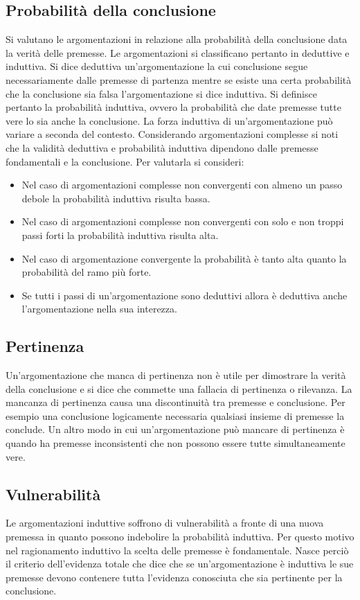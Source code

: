 \subsection{Probabilit\`a della conclusione}
Si valutano le argomentazioni in relazione alla probabilit\`a della conclusione data la verit\`a delle premesse. Le argomentazioni si classificano pertanto in deduttive e induttiva. Si dice deduttiva 
un'argomentazione la cui conclusione segue necessariamente dalle premesse di partenza mentre se esiste una certa probabilit\`a che la conclusione sia falsa l'argomentazione si dice induttiva. Si definisce 
pertanto la probabilit\`a induttiva, ovvero la probabilit\`a che date premesse tutte vere lo sia anche la conclusione. La forza induttiva di un'argomentazione pu\`o variare a seconda del contesto. 
Considerando argomentazioni complesse si noti che la validit\`a deduttiva e probabilit\`a induttiva dipendono dalle premesse fondamentali e la conclusione. Per valutarla si consideri:
\begin{itemize}
\item Nel caso di argomentazioni complesse non convergenti con almeno un passo debole la probabilit\`a induttiva risulta bassa.
\item Nel caso di argomentazioni complesse non convergenti con solo e non troppi passi forti la probabilit\`a induttiva risulta alta.
\item Nel caso di argomentazione convergente la probabilit\`a \`e tanto alta quanto la probabilit\`a del ramo pi\`u forte.
\item Se tutti i passi di un'argomentazione sono deduttivi allora \`e deduttiva anche l'argomentazione nella sua interezza.
\end{itemize}
\subsection{Pertinenza}
Un'argomentazione che manca di pertinenza non \`e utile per dimostrare la verit\`a della conclusione e si dice che commette una fallacia di pertinenza o rilevanza. La mancanza di pertinenza causa una 
discontinuit\`a tra premesse e conclusione. Per esempio una conclusione logicamente necessaria qualsiasi insieme di premesse la conclude. Un altro modo in cui un'argomentazione pu\`o mancare di pertinenza 
\`e quando ha premesse inconsistenti che non possono essere tutte simultaneamente vere. 
\subsection{Vulnerabilit\`a}
Le argomentazioni induttive soffrono di vulnerabilit\`a a fronte di una nuova premessa in quanto possono indebolire la probabilit\`a induttiva. Per questo motivo nel ragionamento induttivo la scelta delle 
premesse \`e fondamentale. Nasce perci\`o il criterio dell'evidenza totale che dice che se un'argomentazione \`e induttiva le sue premesse devono contenere tutta l'evidenza conosciuta che sia pertinente per la 
conclusione. 

